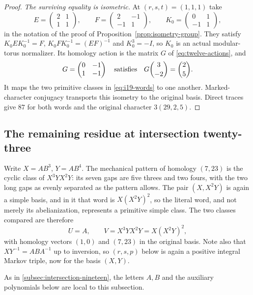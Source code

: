 \begin{proof}
\smallskip\noindent\emph{The surviving equality is isometric.}
At $(r,s,t)=(1,1,1)$ take
$$
 E=\begin{pmatrix}2&1\\1&1\end{pmatrix},\qquad
 F=\begin{pmatrix}2&-1\\-1&1\end{pmatrix},\qquad
 K_0=\begin{pmatrix}0&1\\-1&1\end{pmatrix},
$$
in the notation of the proof of Proposition~\ref{prop:isometry-group}. They satisfy $K_0EK_0^{-1}=F$, $K_0FK_0^{-1}=(EF)^{-1}$ and $K_0^3=-I$, so $K_0$ is an actual modular-torus normalizer. Its homology action is the matrix $G$ of \eqref{eq:twelve-actions}, and
$$
 G=\begin{pmatrix}0&-1\\1&-1\end{pmatrix}
 \quad\hbox{satisfies}\quad G\binom{3}{-2}=\binom25.
$$
It maps the two primitive classes in \eqref{eq:i19-words} to one another. Marked-character conjugacy transports this isometry to the original basis. Direct traces give $87$ for both words and the original character $3(29,2,5)$.
\end{proof}

\subsection{The remaining residue at intersection twenty-three}
\label{subsec:intersection-twentythree}

Write $X=AB^3$, $Y=AB^4$. The mechanical pattern of homology $(7,23)$ is
the cyclic class of $X^3YX^2Y$: its seven gaps are five threes and two
fours, with the two long gaps as evenly separated as the pattern allows.
The pair $(X,X^2Y)$ is again a simple basis, and in it that word is
$X(X^2Y)^2$, so the literal word, and not merely its abelianization,
represents a primitive simple class. The two classes compared are
therefore
\begin{equation}
 U=A,\qquad V=X^3YX^2Y=X(X^2Y)^2 ,
 \label{eq:i23-words}
\end{equation}
with homology vectors $(1,0)$ and $(7,23)$ in the original basis.
Note also that $XY^{-1}=ABA^{-1}$ up to inversion, so $(r,s,p)$ below is
again a positive integral Markov triple, now for the basis $(X,Y)$.

As in \ref{subsec:intersection-nineteen}, the letters $A,B$ and the
auxiliary polynomials below are local to this subsection.

